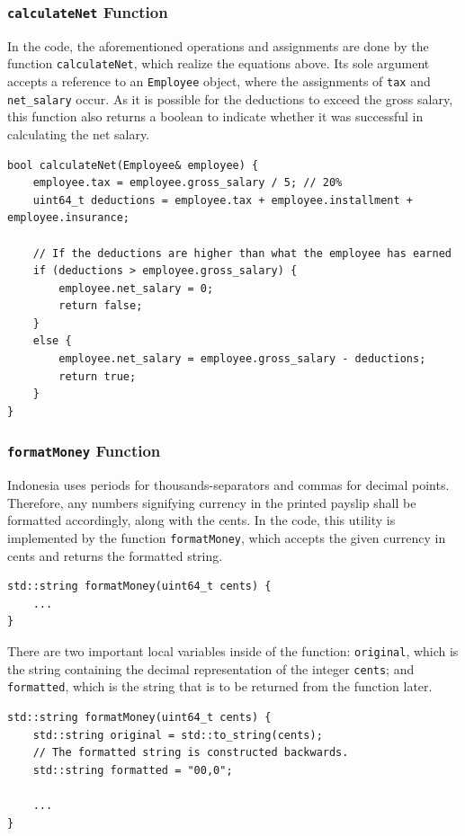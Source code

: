\documentclass[12pt]{article}
\begin{document}
\subsubsection{\texttt{calculateNet} Function}

In the code, the aforementioned operations and assignments are done by the function \texttt{calculateNet}, which realize the equations above. Its sole argument accepts a reference to an \texttt{Employee} object, where the assignments of \texttt{tax} and \texttt{net\_salary} occur. As it is possible for the deductions to exceed the gross salary, this function also returns a boolean to indicate whether it was successful in calculating the net salary.

\begin{verbatim}
bool calculateNet(Employee& employee) {
    employee.tax = employee.gross_salary / 5; // 20%
    uint64_t deductions = employee.tax + employee.installment + employee.insurance;

    // If the deductions are higher than what the employee has earned
    if (deductions > employee.gross_salary) {
        employee.net_salary = 0;
        return false;
    }
    else {
        employee.net_salary = employee.gross_salary - deductions;
        return true;
    }
}
\end{verbatim}

\subsubsection{\texttt{formatMoney} Function}

Indonesia uses periods for thousands-separators and commas for decimal points. Therefore, any numbers signifying currency in the printed payslip shall be formatted accordingly, along with the cents. In the code, this utility is implemented by the function \texttt{formatMoney}, which accepts the given currency in cents and returns the formatted string.

\begin{verbatim}
std::string formatMoney(uint64_t cents) {
    ...
}
\end{verbatim}

There are two important local variables inside of the function: \texttt{original}, which is the string containing the decimal representation of the integer \texttt{cents}; and \texttt{formatted}, which is the string that is to be returned from the function later.

\begin{verbatim}
std::string formatMoney(uint64_t cents) {
    std::string original = std::to_string(cents);
    // The formatted string is constructed backwards.
    std::string formatted = "00,0";

    ...
}
\end{verbatim}
\end{document}
